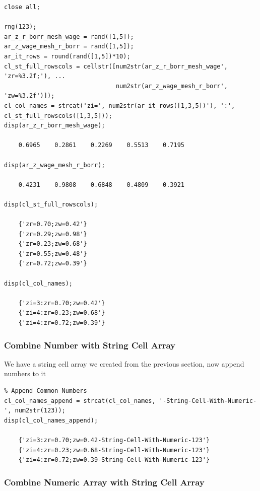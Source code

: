 \documentclass[
]{book}
\begin{document}
\begin{verbatim}
close all;

rng(123);
ar_z_r_borr_mesh_wage = rand([1,5]);
ar_z_wage_mesh_r_borr = rand([1,5]);
ar_it_rows = round(rand([1,5])*10);
cl_st_full_rowscols = cellstr([num2str(ar_z_r_borr_mesh_wage', 'zr=%3.2f;'), ...
                               num2str(ar_z_wage_mesh_r_borr', 'zw=%3.2f')]);
cl_col_names = strcat('zi=', num2str(ar_it_rows([1,3,5])'), ':', cl_st_full_rowscols([1,3,5]));
disp(ar_z_r_borr_mesh_wage);

    0.6965    0.2861    0.2269    0.5513    0.7195

disp(ar_z_wage_mesh_r_borr);

    0.4231    0.9808    0.6848    0.4809    0.3921

disp(cl_st_full_rowscols);

    {'zr=0.70;zw=0.42'}
    {'zr=0.29;zw=0.98'}
    {'zr=0.23;zw=0.68'}
    {'zr=0.55;zw=0.48'}
    {'zr=0.72;zw=0.39'}

disp(cl_col_names);

    {'zi=3:zr=0.70;zw=0.42'}
    {'zi=4:zr=0.23;zw=0.68'}
    {'zi=4:zr=0.72;zw=0.39'}
\end{verbatim}

\hypertarget{combine-number-with-string-cell-array}{%
\subsubsection{Combine Number with String Cell Array}\label{combine-number-with-string-cell-array}}

We have a string cell array we created from the previous section, now
append numbers to it

\begin{verbatim}
% Append Common Numbers
cl_col_names_append = strcat(cl_col_names, '-String-Cell-With-Numeric-', num2str(123));
disp(cl_col_names_append);

    {'zi=3:zr=0.70;zw=0.42-String-Cell-With-Numeric-123'}
    {'zi=4:zr=0.23;zw=0.68-String-Cell-With-Numeric-123'}
    {'zi=4:zr=0.72;zw=0.39-String-Cell-With-Numeric-123'}
\end{verbatim}

\hypertarget{combine-numeric-array-with-string-cell-array}{%
\subsubsection{Combine Numeric Array with String Cell Array}\label{combine-numeric-array-with-string-cell-array}}
\end{document}
